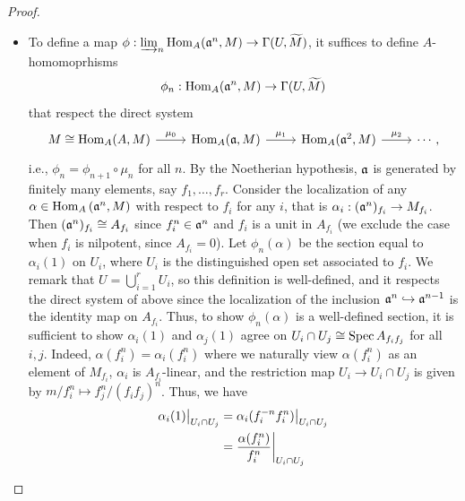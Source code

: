 \documentclass[a4paper]{article}
\begin{document}
\begin{enumerate} [label=\textbf{\arabic*.}, leftmargin=0em]
        \begin{proof} $ $ \vspace{0pt}
          \begin{itemize} [leftmargin=0cm]
            \item[(a)] To define a map $\phi : \varinjlim_n \operatorname{Hom}_A(\mathfrak{a}^n, M) \to \Gamma(U, \widetilde{M})$, it suffices to define $A$-homomoprhisms $$\phi_n : \operatorname{Hom}_A(\mathfrak{a}^n, M) \to \Gamma(U, \widetilde{M})$$ that respect the direct system
                  \[ \begin{tikzcd}
                      {M \cong \Hom_A(A, M)} \arrow[r, "\mu_0"] & {\Hom_A(\goth{a}, M)} \arrow[r, "\mu_1"] & {\Hom_A(\goth{a}^2, M)} \arrow[r, "\mu_2"] & \cdots,
                    \end{tikzcd} \]
                  i.e., $\phi_n = \phi_{n + 1} \circ \mu_n$ for all $n$.
                  By the Noetherian hypothesis, $\mathfrak{a}$ is generated by finitely many elements, say $f_1, \dots, f_r$.
                  Consider the localization of any $\alpha \in \operatorname{Hom}_A{(\mathfrak{a}^n, M)}$ with respect to $f_i$ for any $i$, that is $\alpha_i : (\mathfrak{a}^n)_{f_i}\to M_{f_i}$.
                  Then $(\mathfrak{a}^n)_{f_i} \cong A_{f_i}$ since $f_i^n \in \mathfrak{a}^n$ and $f_i$ is a unit in $A_{f_i}$ (we exclude the case when $f_i$ is nilpotent, since $A_{f_i} = 0$).
                  Let $\phi_n(\alpha)$ be the section equal to $\alpha_i(1)$ on $U_i$, where $U_i$ is the distinguished open set associated to $f_i$.
                  We remark that $U = \bigcup_{i = 1}^r U_i$, so this definition is well-defined, and it respects the direct system of above since the localization of the inclusion $\mathfrak{a}^{n} \hookrightarrow \mathfrak{a}^{n - 1}$ is the identity map on $A_{f_i}$.
                  Thus, to show $\phi_n(\alpha)$ is a well-defined section, it is sufficient to show $\alpha_i(1)$ and $\alpha_j(1)$ agree on $U_i \cap U_j \cong \operatorname{Spec}{A_{f_if_j}}$ for all $i, j$.
                  Indeed, $\alpha(f_i^n) = \alpha_i(f_i^n)$ where we naturally view $\alpha(f_i^n)$ as an element of $M_{f_i}$, $\alpha_i$ is $A_{f_i}$-linear, and the restriction map $U_i \to U_i \cap U_j$ is given by $m/f_i^n \mapsto f_j^n/(f_if_j)^n$.
                  Thus, we have
                  \begin{align*}
                    \restr{\alpha_i(1)}{U_i \cap U_j} & = \restr{\alpha_i(f_i^{-n}f_i^n)}{U_i \cap U_j}     \\
                                                      & = \restr{\frac{\alpha(f_i^n)}{f_i^n}}{U_i \cap U_j} \\

\end{align*}
\end{itemize}
\end{proof}
\end{enumerate}
\end{document}
